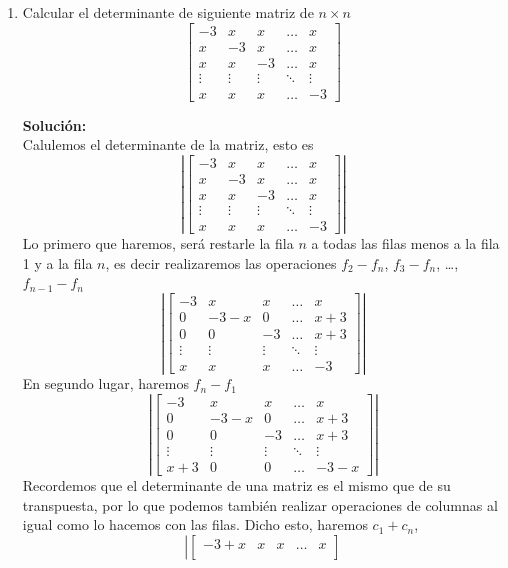 \documentclass[12pt]{article}
\newenvironment{solucion}
{\begin{mdframed}[backgroundcolor=black!10]
		{\bf Solución:}\\
	}
	{
	\end{mdframed}
}
\newenvironment{preguntas}
{\begin{enumerate}\itemsep12pt
	}
	{
	\end{enumerate}
}
\begin{document}
\begin{preguntas}
\item Calcular el determinante de siguiente matriz de $n\times n$
	$$ \begin{bmatrix}
	-3 & x & x & \dots & x \\
	x & -3 & x & \dots & x \\
	x & x & -3 & \dots & x \\
	\vdots & \vdots & \vdots & \ddots & \vdots \\
	x & x & x & \dots & -3
	\end{bmatrix}$$
\begin{solucion}
Calulemos el determinante de la matriz, esto es
		$$ \left|\begin{bmatrix}
		-3 & x & x & \dots & x \\
		x & -3 & x & \dots & x \\
		x & x & -3 & \dots & x \\
		\vdots & \vdots & \vdots & \ddots & \vdots \\
		x & x & x & \dots & -3
		\end{bmatrix}\right|$$
		Lo primero que haremos, será restarle la fila $n$ a todas las filas menos a la fila 1 y a la fila $n$, es decir realizaremos las operaciones $f_2-f_n$, $f_3-f_n$, \dots, $f_{n-1} - f_n$
		$$ \left|\begin{bmatrix}
		-3 & x & x & \dots & x \\
		0 & -3-x & 0 & \dots & x+3 \\
		0 & 0 & -3 & \dots & x+3 \\
		\vdots & \vdots & \vdots & \ddots & \vdots \\
		x & x & x & \dots & -3
		\end{bmatrix}\right|$$
		En segundo lugar, haremos $f_n-f_1$
		$$ \left|\begin{bmatrix}
		-3 & x & x & \dots & x \\
		0 & -3-x & 0 & \dots & x+3 \\
		0 & 0 & -3 & \dots & x+3 \\
		\vdots & \vdots & \vdots & \ddots & \vdots \\
		x+3 & 0 & 0 & \dots & -3-x
		\end{bmatrix}\right|$$
		Recordemos que el determinante de una matriz es el mismo que de su transpuesta, por lo que podemos también realizar operaciones de columnas al igual como lo hacemos con las filas. Dicho esto, haremos $c_1 + c_n$,
		$$ \left|\begin{bmatrix}
		-3+x & x & x & \dots & x \\

\end{bmatrix}$$
\end{solucion}
\end{preguntas}
\end{document}
